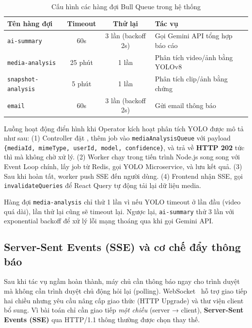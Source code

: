 \documentclass[../DoAn.tex]{subfiles}
\begin{document}
\begin{table}[H]
\centering
\caption{Cấu hình các hàng đợi Bull Queue trong hệ thống}
\label{tab:queues}
\small
\begin{tabular}{|p{3.8cm}|c|c|p{4.8cm}|}
\hline
\textbf{Tên hàng đợi} & \textbf{Timeout} & \textbf{Thử lại} & \textbf{Tác vụ} \\
\hline
\texttt{ai-summary} & 60s & 3 lần (backoff 2s) & Gọi Gemini API tổng hợp báo cáo \\
\hline
\texttt{media-analysis} & 25 phút & 1 lần & Phân tích video/ảnh bằng YOLOv8 \\
\hline
\texttt{snapshot-analysis} & 5 phút & 1 lần & Phân tích clip/ảnh bằng chứng \\
\hline
\texttt{email} & 60s & 3 lần (backoff 2s) & Gửi email thông báo \\
\hline
\end{tabular}
\end{table}

Luồng hoạt động điển hình khi Operator kích hoạt phân tích YOLO được mô tả như sau: (1) Controller đặt , thêm job vào \texttt{mediaAnalysisQueue} với payload \texttt{\{mediaId, mimeType, userId,\allowbreak{} model, confidence\}}, và trả về \textbf{HTTP 202} tức thì mà không chờ xử lý. (2) Worker chạy trong tiến trình Node.js song song với Event Loop chính, lấy job từ Redis, gọi YOLO Microservice, và lưu kết quả. (3) Sau khi hoàn tất, worker push SSE đến người dùng. (4) Frontend nhận SSE, gọi \texttt{invalidateQueries} để React Query tự động tải lại dữ liệu media.

Hàng đợi \texttt{media-analysis} chỉ thử 1 lần vì nếu YOLO timeout ở lần đầu (video quá dài), lần thử lại cũng sẽ timeout lại. Ngược lại, \texttt{ai-summary} thử 3 lần với exponential backoff để xử lý lỗi mạng thoáng qua khi gọi Gemini API.

\subsection{Server-Sent Events (SSE) và cơ chế đẩy thông báo}

Sau khi tác vụ ngầm hoàn thành, máy chủ cần thông báo ngay cho trình duyệt mà không cần trình duyệt chủ động hỏi lại (polling). WebSocket~\cite{sse_mdn} hỗ trợ giao tiếp hai chiều nhưng yêu cầu nâng cấp giao thức (HTTP Upgrade) và thư viện client bổ sung. Vì bài toán chỉ cần giao tiếp \textit{một chiều} (server → client), \textbf{Server-Sent Events (SSE)} qua HTTP/1.1 thông thường được chọn thay thế.
\end{document}

